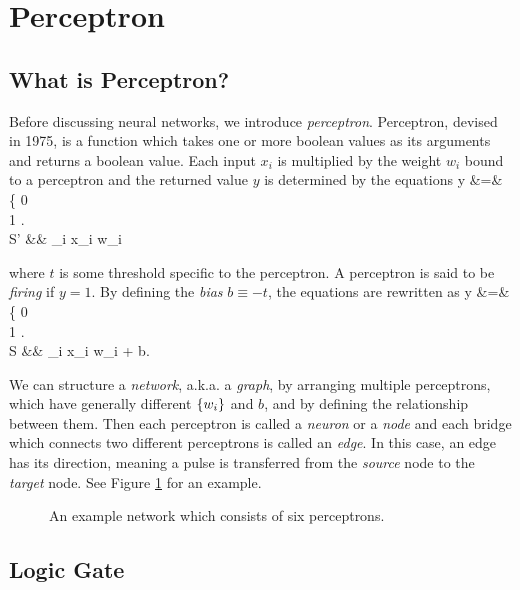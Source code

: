 \documentclass{article}
\theoremstyle{definition}
\newcommand{\fig}[1]{Figure \ref{fig:#1}}
\begin{document}

\newpage
\section{Perceptron}

\subsection{What is Perceptron?} \label{section:2.1}

Before discussing neural networks, we introduce {\it perceptron}. Perceptron, devised in 1975, is a function which takes one or more boolean values as its arguments and returns a boolean value. Each input $x_i$ is multiplied by the weight $w_i$ bound to a perceptron and the returned value $y$ is determined by the equations
\begineq
y &=& \left\{  0  \\ 1  \edarray \right.  \\
S' &\equiv& \sum _i x_i w_i 
\edeq

where $t$ is some threshold specific to the perceptron. A perceptron is said to be {\it firing} if $y = 1$. By defining the {\it bias} $b \equiv -t$, the equations are rewritten as
\begineq
y &=& \left\{  0  \\ 1  \edarray \right.  \\
S &\equiv& \sum _i x_i w_i + b. 
\edeq

We can structure a {\it network}, a.k.a. a {\it graph}, by arranging multiple perceptrons, which have generally different $\left\{ w_i \right\}$ and $b$, and by defining the relationship between them. Then each perceptron is called a {\it neuron} or a {\it node} and each bridge which connects two different perceptrons is called an {\it edge}. In this case, an edge has its direction, meaning a pulse is transferred from the {\it source} node to the {\it target} node. See \fig{2.1} for an example.

\begin{figure}[H]
    \centering
    \begin{subfigure}[H]{1.0\textwidth}
	\end{subfigure}
    \caption{An example network which consists of six perceptrons.}
    \label{fig:2.1}
\end{figure}

\subsection{Logic Gate}
\end{document}
